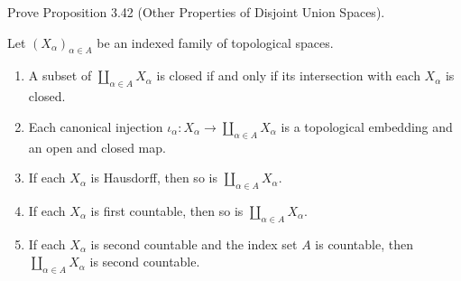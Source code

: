 \begin{exercise}{3.43}\label{exercise:3.43}
    Prove Proposition 3.42 (Other Properties of Disjoint Union Spaces).

    Let ${(X_{\alpha})}_{\alpha\in A}$ be an indexed family of topological spaces.
    \begin{enumerate}[label={(\alph*)}]
        \item A subset of $\coprod_{\alpha\in A}X_{\alpha}$ is closed if and only if its intersection with each $X_{\alpha}$ is closed.
        \item Each canonical injection $\iota_{\alpha}: X_{\alpha}\to \coprod_{\alpha\in A}X_{\alpha}$ is a topological embedding and an open and closed map.
        \item If each $X_{\alpha}$ is Hausdorff, then so is $\coprod_{\alpha\in A}X_{\alpha}$.
        \item If each $X_{\alpha}$ is first countable, then so is $\coprod_{\alpha\in A}X_{\alpha}$.
        \item If each $X_{\alpha}$ is second countable and the index set $A$ is countable, then $\coprod_{\alpha\in A}X_{\alpha}$ is second countable.
    \end{enumerate}
\end{exercise}

